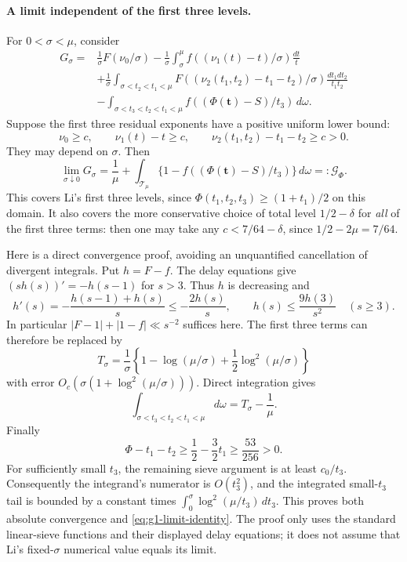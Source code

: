 \documentclass[11pt]{article}
\begin{document}
\paragraph{A limit independent of the first three levels.}
For $0<\sigma<\mu$, consider
\begin{align*}
 G_\sigma={}&\frac1\sigma F(\nu_0/\sigma)
 -\frac1\sigma\int_\sigma^\mu
          f((\nu_1(t)-t)/\sigma)\frac{dt}{t}\\
 &+\frac1\sigma\int_{\sigma<t_2<t_1<\mu}
          F((\nu_2(t_1,t_2)-t_1-t_2)/\sigma)
                         \frac{dt_1dt_2}{t_1t_2}\\
 &-\int_{\sigma<t_3<t_2<t_1<\mu}
          f((\Phi(\boldsymbol t)-S)/t_3)\,d\omega.
\end{align*}
Suppose the first three residual exponents have a positive uniform
lower bound:
\[
 \nu_0\ge c,\qquad \nu_1(t)-t\ge c,\qquad
 \nu_2(t_1,t_2)-t_1-t_2\ge c>0.
\]
They may depend on $\sigma$. Then
\begin{equation}\label{eq:g1-limit-identity}
 \lim_{\sigma\downarrow0}G_\sigma
 =\frac1\mu+\int_{\mathcal T_\mu}
       \{1-f((\Phi(\boldsymbol t)-S)/t_3)\}\,d\omega
 =:\mathcal G_\Phi.
\end{equation}
This covers Li's first three levels, since
$\Phi(t_1,t_2,t_3)\ge(1+t_1)/2$ on this domain. It also covers
the more conservative choice of total level $1/2-\delta$ for
\emph{all} of the first three terms: then one may take any
$c<7/64-\delta$, since $1/2-2\mu=7/64$.

Here is a direct convergence proof, avoiding an unquantified
cancellation of divergent integrals. Put $h=F-f$. The
delay equations give $(sh(s))'=-h(s-1)$ for $s>3$.
Thus $h$ is decreasing and
\[
 h'(s)=-\frac{h(s-1)+h(s)}s\le-\frac{2h(s)}s,
 \qquad h(s)\le\frac{9h(3)}{s^2}\quad(s\ge3).
\]
In particular $|F-1|+|1-f|\ll s^{-2}$ suffices here.
The first three terms can therefore be replaced by
\[
 T_\sigma=\frac1\sigma
    \left\{1-\log(\mu/\sigma)+\frac12\log^2(\mu/\sigma)\right\}
\]
with error $O_c(\sigma(1+\log^2(\mu/\sigma)))$.
Direct integration gives
\[
 \int_{\sigma<t_3<t_2<t_1<\mu}d\omega=T_\sigma-\frac1\mu.
\]
Finally
\[
 \Phi-t_1-t_2\ge\frac12-\frac32t_1
       \ge\frac{53}{256}>0.
\]
For sufficiently small $t_3$, the remaining sieve argument is
at least $c_0/t_3$. Consequently the integrand's numerator is
$O(t_3^2)$, and the integrated small-$t_3$ tail is bounded by a
constant times $\int_0^\sigma\log^2(\mu/t_3)\,dt_3$.
This proves both absolute convergence and
\eqref{eq:g1-limit-identity}. The proof only uses the standard
linear-sieve functions and their displayed delay equations;
it does not assume that Li's fixed-$\sigma$ numerical value equals
its limit.
\end{document}
